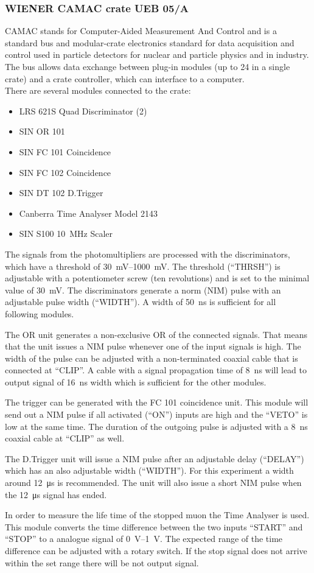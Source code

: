 \subsubsection*{WIENER CAMAC crate UEB 05/A}
CAMAC stands for Computer-Aided Measurement And Control and is a standard bus and modular-crate electronics standard for data acquisition and control used in particle detectors for nuclear and particle physics and in industry. The bus allows data exchange between plug-in modules (up to 24 in a single crate) and a crate controller, which can interface to a computer.\\
There are several modules connected to the crate:
\begin{itemize}
	\item LRS 621S Quad Discriminator (2)
	\item SIN OR 101
	\item SIN FC 101 Coincidence
	\item SIN FC 102 Coincidence
	\item SIN DT 102 D.Trigger
	\item Canberra Time Analyser Model 2143
	\item SIN S100 \SI{10}{\mega\hertz} Scaler
\end{itemize}
The signals from the photomultipliers are processed with the discriminators, which have a threshold of \SIrange{30}{1000}{\milli\volt}. The threshold (``THRSH'') is adjustable with a potentiometer screw (ten revolutions) and is set to the minimal value of \SI{30}{\milli\volt}. The discriminators generate a norm (NIM) pulse with an adjustable pulse width (``WIDTH''). A width of \SI{50}{\nano\second} is sufficient for all following modules.\par
The OR unit generates a non-exclusive OR of the connected signals. That means that the unit issues a NIM pulse whenever one of the input signals is high. The width of the pulse can be adjusted with a non-terminated coaxial cable that is connected at ``CLIP''. A cable with a signal propagation time of \SI{8}{\nano\second} will lead to output signal of \SI{16}{\nano\second} width which is sufficient for the other modules.\par
The trigger can be generated with the FC 101 coincidence unit. This module will send out a NIM pulse if all activated (``ON'') inputs are high and the ``VETO'' is low at the same time. The duration of the outgoing pulse is adjusted with a \SI{8}{\nano\second} coaxial cable at ``CLIP'' as well.\par
The D.Trigger unit will issue a NIM pulse after an adjustable delay (``DELAY'') which has an also adjustable width (``WIDTH''). For this experiment a width around \SI{12}{\micro\second} is recommended. The unit will also issue a short NIM pulse when the \SI{12}{\micro\second} signal has ended.\par
In order to measure the life time of the stopped muon the Time Analyser is used. This module converts the time difference between the two inputs ``START'' and ``STOP'' to a analogue signal of \SIrange{0}{1}{\volt}. The expected range of the time difference can be adjusted with a rotary switch. If the stop signal does not arrive within the set range there will be not output signal.

